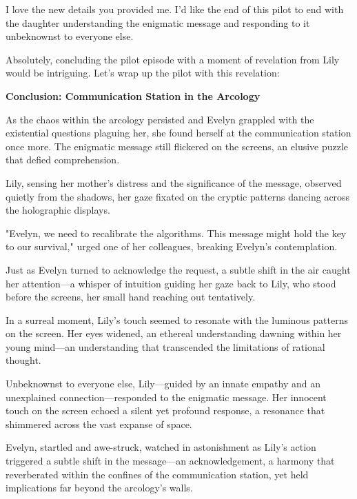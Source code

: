 \begin{qquote}
    I love the new details you provided me. I'd like the end of this pilot to end with the daughter understanding the enigmatic message and responding to it unbeknownst to everyone else. 
\end{qquote}

\begin{aquote}
    Absolutely, concluding the pilot episode with a moment of revelation from Lily would be intriguing. Let's wrap up the pilot with this revelation:\medskip

    \noindent\textbf{Conclusion: Communication Station in the Arcology}

    As the chaos within the arcology persisted and Evelyn grappled with the existential questions plaguing her, she found herself at the communication station once more. The enigmatic message still flickered on the screens, an elusive puzzle that defied comprehension.

    Lily, sensing her mother's distress and the significance of the message, observed quietly from the shadows, her gaze fixated on the cryptic patterns dancing across the holographic displays.

    "Evelyn, we need to recalibrate the algorithms. This message might hold the key to our survival," urged one of her colleagues, breaking Evelyn's contemplation.

    Just as Evelyn turned to acknowledge the request, a subtle shift in the air caught her attention—a whisper of intuition guiding her gaze back to Lily, who stood before the screens, her small hand reaching out tentatively.

    In a surreal moment, Lily's touch seemed to resonate with the luminous patterns on the screen. Her eyes widened, an ethereal understanding dawning within her young mind—an understanding that transcended the limitations of rational thought.

    Unbeknownst to everyone else, Lily—guided by an innate empathy and an unexplained connection—responded to the enigmatic message. Her innocent touch on the screen echoed a silent yet profound response, a resonance that shimmered across the vast expanse of space.

    Evelyn, startled and awe-struck, watched in astonishment as Lily's action triggered a subtle shift in the message—an acknowledgement, a harmony that reverberated within the confines of the communication station, yet held implications far beyond the arcology's walls.


\end{aquote}
